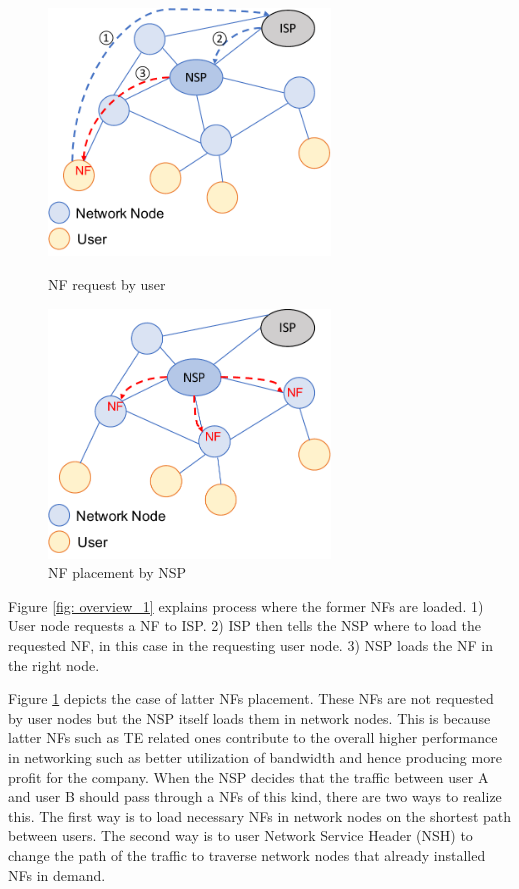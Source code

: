 \begin{figure}[htbp]
	\begin{minipage}{0.5\hsize}
		\begin{center}
			\includegraphics[width=75mm]{pics/overview_1.pdf}
		\end{center}
		\caption{NF request by user}
		\label{fig: overview_1}
	\end{minipage}	
	\begin{minipage}{0.5\hsize}
		\begin{center}
			\includegraphics[width=75mm]{pics/overview_2.pdf}
		\end{center}
		\caption{NF placement by NSP}
		\label{fig: overview_2}
	\end{minipage}	
\end{figure}

Figure \ref{fig: overview_1} explains process where the former NFs are loaded. 1) User node requests a NF to ISP. 2) ISP then tells the NSP where to load the requested NF, in this case in the requesting user node. 3) NSP loads the NF in the right node. 

Figure \ref{fig: overview_2} depicts the case of latter NFs placement. These NFs are not requested by user nodes but the NSP itself loads them in network nodes. This is because latter NFs such as TE related ones contribute to the overall higher performance in networking such as better utilization of bandwidth and hence producing more profit for the company. When the NSP decides that the traffic between user A and user B should pass through a NFs of this kind, there are two ways to realize this. The first way is to load necessary NFs in network nodes on the shortest path between users. The second way is to user Network Service Header (NSH\cite{NSH}) to change the path of the traffic to traverse network nodes that already installed NFs in demand. 

